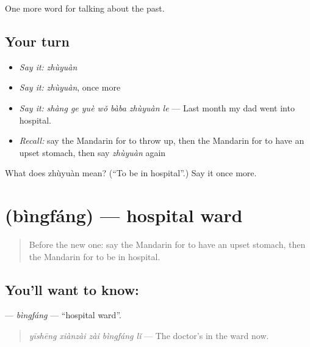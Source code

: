 \begin{grammarlens}[title={What you've built}]
One more word for talking about the past.
\end{grammarlens}

\subsection*{Your turn}
\begin{itemize}
\raggedright
  \item \emph{Say it:} \emph{zhùyuàn}
  \item \emph{Say it:} \emph{zhùyuàn}, once more
  \item \emph{Say it:} \emph{shàng ge yuè wǒ bàba zhùyuàn le} — Last month my dad went into hospital.
  \item \emph{Recall:} say the Mandarin for to throw up, then the Mandarin for to have an upset stomach, then say \emph{zhùyuàn} again
\end{itemize}

\begin{tcolorbox}[breakable,colback=teal!4,colframe=teal!35!black,title={Before you move on}]
What does zhùyuàn mean? (\textquotedblleft{}To be in hospital\textquotedblright{}.) Say it once more.
\end{tcolorbox}
\section[\texorpdfstring{\zh{病房} (bìngfáng)}{病房 (bìngfáng)}]{ (bìngfáng) — hospital ward}

\label{lesson:ZH-C241-bingfang}



\begin{quote}
Before the new one: say the Mandarin for to have an upset stomach, then the Mandarin for to be in hospital.
\end{quote}

\subsection*{You'll want to know: }
\textbf{} — \emph{bìngfáng} — \textquotedblleft{}hospital ward\textquotedblright{}.

\begin{quote}
\textbf{} \emph{yīshēng xiànzài zài bìngfáng lǐ} — The doctor's in the ward now.
\end{quote}

